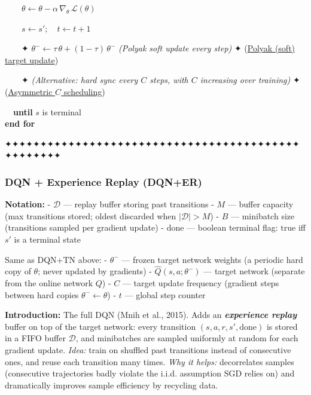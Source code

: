 \documentclass[11pt]{article}
\begin{document}
\begin{pseudobox}
\strut ~~~~\(\theta \leftarrow \theta - \alpha\, \nabla_{\theta}\, \mathcal{L}(\theta)\)\\
\strut ~~~~\(s \leftarrow s';\quad t \leftarrow t + 1\)\\
\strut ~~~~✦
\(\theta^{-} \leftarrow \tau\,\theta + (1 - \tau)\,\theta^{-}\)
\emph{(Polyak soft update every step)} ✦ (\hyperref[trick-3-2-1]{Polyak
(soft) target update})\\
\strut ~~~~✦ \emph{(Alternative: hard sync every \(C\) steps, with \(C\)
increasing over training)} ✦ (\hyperref[trick-3-2-3]{Asymmetric \(C\)
scheduling})\\
\strut ~~\textbf{until} \(s\) is terminal\\
\textbf{end for}

\end{pseudobox}

    ✦✦✦✦✦✦✦✦✦✦✦✦✦✦✦✦✦✦✦✦✦✦✦✦✦✦✦✦✦✦✦✦✦✦✦✦✦✦✦✦✦✦✦✦✦✦✦✦✦✦

    \clearpage

\label{dqn-experience-replay}

    \subsubsection{DQN + Experience Replay
(DQN+ER)}\label{dqn-experience-replay-dqner}

    \textbf{Notation:} - \(\mathcal{D}\) --- replay buffer storing past
transitions - \(M\) --- buffer capacity (max transitions stored; oldest
discarded when \(|\mathcal{D}| > M\)) - \(B\) --- minibatch size
(transitions sampled per gradient update) - \(\text{done}\) --- boolean
terminal flag: \(\text{true}\) iff \(s'\) is a terminal state

Same as DQN+TN above: - \(\theta^-\) --- frozen target network weights
(a periodic hard copy of \(\theta\); never updated by gradients) -
\(\hat{Q}(s,a;\theta^-)\) --- target network (separate from the online
network \(Q\)) - \(C\) --- target update frequency (gradient steps
between hard copies \(\theta^- \leftarrow \theta\)) - \(t\) --- global
step counter

    \label{intro-3-3}

    \textbf{Introduction:} The full DQN (Mnih et al., 2015). Adds an
\textbf{\emph{experience replay}} buffer on top of the target network:
every transition \((s,a,r,s',\text{done})\) is stored in a FIFO buffer
\(\mathcal{D}\), and minibatches are sampled uniformly at random for
each gradient update. \emph{Idea:} train on shuffled past transitions
instead of consecutive ones, and reuse each transition many times.
\emph{Why it helps:} decorrelates samples (consecutive trajectories
badly violate the i.i.d. assumption SGD relies on) and dramatically
improves sample efficiency by recycling data.
\end{document}
